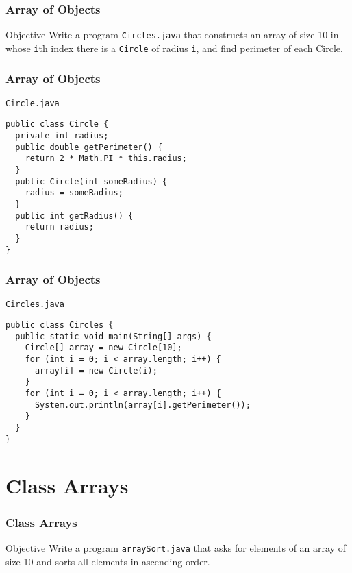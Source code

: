 \documentclass[10pt, compress]{beamer}
\begin{document}
\begin{frame}[fragile]
  \frametitle{Array of Objects}
  \begin{block}{Objective}
    Write a program \texttt{Circles.java} that constructs an array of size 10 in whose \texttt{i}th index there is a \texttt{Circle} of radius \texttt{i}, and find perimeter of each Circle.
  \end{block}
\end{frame}

\begin{frame}[fragile]
  \frametitle{Array of Objects}
  \begin{block}{\texttt{Circle.java}}
    \begin{verbatim}
public class Circle {
  private int radius;
  public double getPerimeter() {
    return 2 * Math.PI * this.radius;
  }
  public Circle(int someRadius) {
    radius = someRadius;
  }
  public int getRadius() {
    return radius;
  }
}
    \end{verbatim}
  \end{block}
\end{frame}

\begin{frame}[fragile]
  \frametitle{Array of Objects}
  \begin{block}{\texttt{Circles.java}}
    \begin{verbatim}
public class Circles {
  public static void main(String[] args) {
    Circle[] array = new Circle[10];
    for (int i = 0; i < array.length; i++) {
      array[i] = new Circle(i);
    }
    for (int i = 0; i < array.length; i++) {
      System.out.println(array[i].getPerimeter());
    }
  }
}
    \end{verbatim}
  \end{block}
\end{frame}

\section{Class Arrays}

\begin{frame}[fragile]
  \frametitle{Class Arrays}
  \begin{block}{Objective}
    Write a program \texttt{arraySort.java} that asks for elements of an array of size 10 and sorts all elements in ascending order.
  \end{block}
\end{frame}
\end{document}
